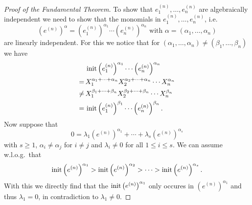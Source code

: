 \begin{proof}[Proof of the Fundamental Theorem]
  To show that $e^{(n)}_1, \dotsc, e^{(n)}_n$ are algebraically independent we need to show that the monomials in $e^{(n)}_1, \dotsc, e^{(n)}_n$, i.e.\
  \[
      \left(e^{(n)}\right)^\alpha
    = \left(e^{(n)}_1\right)^{\alpha_1} \dotsm \left(e^{(n)}_n\right)^{\alpha_n}
    \text{ with }
      \alpha
    = (\alpha_1, \dotsc, \alpha_n)
  \]
  are linearly independent.
  For this we notice that for $(\alpha_1, \dotsc, \alpha_n) \neq (\beta_1, \dotsc, \beta_n)$ we have
  \begin{align*}
        &\, \operatorname{init} \left(e^{(n)}_1\right)^{\alpha_1} \dotsm \left(e^{(n)}_n\right)^{\alpha_n}            \\
       =&\, X_1^{\alpha_1 + \dotsb + \alpha_n} X_2^{\alpha_2 + \dotsb + \alpha_n} \dotsm X_n^{\alpha_n} \\
    \neq&\, X_1^{\beta_1 + \dotsb + \beta_n} X_2^{\beta_2  + \dotsb + \beta_n} \dotsm X_n^{\beta_n}     \\
       =&\, \operatorname{init} \left(e^{(n)}_1\right)^{\beta_1} \dotsm \left(e^{(n)}_n\right)^{\beta_n}.
  \end{align*}
  Now suppose that
  \[
      0
    = \lambda_1 \left(e^{(n)}\right)^{\alpha_1} + \dotsb + \lambda_s \left(e^{(n)}\right)^{\alpha_s}
  \]
  with $s \geq 1$, $\alpha_i \neq \alpha_j$ for $i \neq j$ and $\lambda_i \neq 0$ for all $1 \leq i \leq s$.
  We can assume w.l.o.g.\ that 
  \[
      \operatorname{init} \left(e^{(n)}\right)^{\alpha_1}
    > \operatorname{init} \left(e^{(n)}\right)^{\alpha_2}
    > \dotsb > \operatorname{init} \left(e^{(n)}\right)^{\alpha_s}.
  \]
  With this we directly find that the $\operatorname{init} \left(e^{(n)}\right)^{\alpha_1}$ only occures in $\left(e^{(n)}\right)^{\alpha_1}$ and thus $\lambda_1 = 0$, in contradiction to $\lambda_1 \neq 0$.
\end{proof}


